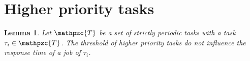 \documentclass[fleqn]{article}
\newtheorem{lemma}{Lemma}
\begin{document}

\section{Higher priority tasks}

\begin{lemma}
	Let $\mathpzc{T}$ be a set of strictly periodic tasks with a task $\tau_i \in \mathpzc{T}$. The threshold of higher priority tasks do not influence the response time of a job of $\tau_i$.
\end{lemma}
\end{document}
